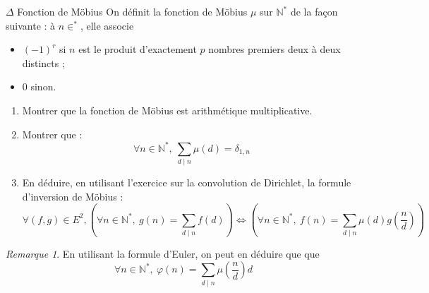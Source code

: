 \documentclass[french,a4paper]{article}
\newcommand{\N}{\mathbb{N}}
\newcommand{\st}{^*}
\theoremstyle{plain}
\theoremstyle{definition}
\theoremstyle{remark}
\newtheorem*{rmq}{Remarque}
\begin{document}
\begin{ex}[Moulin.AG.57]{$\Delta$ Fonction de Möbius}
	On définit la fonction de Möbius $\mu$ sur $\N\st$ de la façon suivante : à $n\in\st$, elle associe
	\begin{itemize} 
		\item $(-1)^r$ si $n$ est le produit d'exactement $p$ nombres premiers deux à deux distincts ;
		\item $0$ sinon. 
	\end{itemize}
	\begin{enumerate}
		\item Montrer que la fonction de Möbius est arithmétique multiplicative.
		\item Montrer que : $$\forall n\in\N\st,\ \sum_{d\mid n}\mu(d)=\delta_{1,n}$$
		\item En déduire, en utilisant l'exercice sur la convolution de Dirichlet, la formule d'inversion de Möbius : $$\forall(f,g)\in E^2, \left(\forall n\in\N\st,\ g(n)=\sum_{d\mid n}f(d)\right)\iff\left(\forall n\in\N\st,\ f(n)=\sum_{d\mid n}\mu(d)g\left(\frac{n}{d}\right)\right)$$
	\end{enumerate}
\end{ex}
\begin{rmq}
	En utilisant la formule d'Euler, on peut en déduire que que $$\forall n\in\N\st,\ \varphi(n)=\sum_{d\mid n}\mu\left(\frac{n}{d}\right)d$$
\end{rmq}
\end{document}
